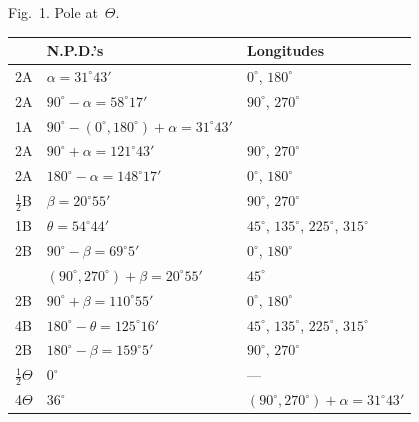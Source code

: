 \documentclass[11pt,a4paper]{book}
\begin{document}
\begin{art}
Fig.~1. Pole at~$\Theta$.

\begin{center}
\begin{tabular}{|l|l|l|}
\hline
& N.P.D.'s & Longitudes \\
\hline
2A & $\alpha = 31^\circ 43'$ & $0^\circ$, $180^\circ$ \\
2A & $90^\circ - \alpha = 58^\circ 17'$ & $90^\circ$, $270^\circ$ \\
1A & $90^\circ - (0^\circ, 180^\circ) + \alpha = 31^\circ 43'$ & \\
2A & $90^\circ + \alpha = 121^\circ 43'$ & $90^\circ$, $270^\circ$ \\
2A & $180^\circ - \alpha = 148^\circ 17'$ & $0^\circ$, $180^\circ$ \\
\hline
$\frac{1}{2}$B & $\beta = 20^\circ 55'$ & $90^\circ$, $270^\circ$ \\
1B & $\theta = 54^\circ 44'$ & $45^\circ$, $135^\circ$, $225^\circ$, $315^\circ$ \\
2B & $90^\circ - \beta = 69^\circ 5'$ & $0^\circ$, $180^\circ$ \\
& $(90^\circ, 270^\circ) + \beta = 20^\circ 55'$ & $45^\circ$ \\
2B & $90^\circ + \beta = 110^\circ 55'$ & $0^\circ$, $180^\circ$ \\
4B & $180^\circ - \theta = 125^\circ 16'$ & $45^\circ$, $135^\circ$, $225^\circ$, $315^\circ$ \\
2B & $180^\circ - \beta = 159^\circ 5'$ & $90^\circ$, $270^\circ$ \\
\hline
$\frac{1}{2}\Theta$ & $0^\circ$ & --- \\
4$\Theta$ & $36^\circ$ & $(90^\circ, 270^\circ) + \alpha = 31^\circ 43'$ \\
\hline
\end{tabular}
\end{center}
\end{art}
\end{document}
